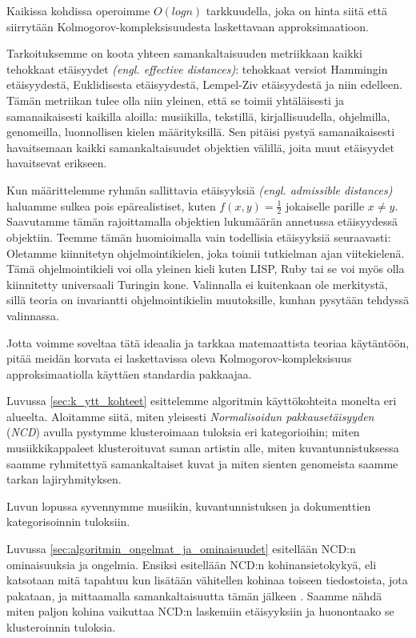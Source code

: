 \documentclass[12pt,finnish]{tktltiki2}
\theoremstyle{definition}
\theoremstyle{remark}
\newcommand{\engl}[1]{\emph{(engl. #1)}}
\begin{document}
  Kaikissa kohdissa  operoimme $O(log n)$ tarkkuudella, joka on hinta siitä että siirrytään Kolmogorov-kompleksisuudesta laskettavaan approksimaatioon.

  Tarkoituksemme on koota yhteen samankaltaisuuden metriikkaan kaikki tehokkaat etäisyydet \engl{effective distances}: tehokkaat versiot Hammingin etäisyydestä, Euklidisesta etäisyydestä, Lempel-Ziv etäisyydestä ja niin edelleen.
  Tämän metriikan tulee olla niin yleinen, että se toimii yhtäläisesti ja samanaikaisesti kaikilla aloilla: musiikilla, tekstillä, kirjallisuudella, ohjelmilla, genomeilla, luonnollisen kielen määrityksillä.
  Sen pitäisi pystyä samanaikaisesti havaitsemaan kaikki samankaltaisuudet objektien välillä, joita muut etäisyydet havaitsevat erikseen.

  Kun määrittelemme ryhmän sallittavia etäisyyksiä \engl{admissible distances} haluamme sulkea pois epärealistiset, kuten $f(x,y) = \frac{1}{2}$ jokaiselle parille $x \neq y$.
  Saavutamme tämän rajoittamalla objektien lukumäärän annetussa etäisyydessä objektiin.
  Teemme tämän huomioimalla vain todellisia etäisyyksiä seuraavasti: Oletamme kiinnitetyn ohjelmointikielen, joka toimii tutkielman ajan viitekielenä.
  Tämä ohjelmointikieli voi olla yleinen kieli kuten LISP, Ruby tai se voi myös olla kiinnitetty universaali Turingin kone. \cite{CV05,cilibrasi2007google}
  Valinnalla ei kuitenkaan ole merkitystä, sillä teoria on invariantti ohjelmointikielin muutoksille, kunhan pysytään tehdyssä valinnassa.


Jotta voimme soveltaa tätä ideaalia ja tarkkaa matemaattista teoriaa käytäntöön, pitää meidän korvata ei laskettavissa oleva Kolmogorov-kompleksisuus approksimaatiolla käyttäen standardia pakkaajaa.

\label{par:intro-3}
  Luvussa \ref{sec:k_ytt_kohteet} esittelemme algoritmin käyttökohteita monelta eri alueelta.
  Aloitamme siitä, miten yleisesti \emph{Normalisoidun pakkausetäisyyden} (\emph{NCD}) avulla pystymme klusteroimaan tuloksia eri kategorioihin; miten musiikkikappaleet klusteroituvat saman artistin alle, miten kuvantunnistuksessa saamme ryhmitettyä samankaltaiset kuvat ja miten sienten genomeista saamme tarkan lajiryhmityksen.


  Luvun lopussa syvennymme musiikin, kuvantunnistuksen ja dokumenttien kategorisoinnin tuloksiin.


\label{par:intro-4}
  Luvussa \ref{sec:algoritmin_ongelmat_ja_ominaisuudet} esitellään NCD:n ominaisuuksia ja ongelmia.
  Ensiksi esitellään NCD:n kohinansietokykyä, eli katsotaan mitä tapahtuu kun lisätään vähitellen kohinaa toiseen tiedostoista, jota pakataan, ja mittaamalla samankaltaisuutta tämän jälkeen \cite{4167725}.
  Saamme nähdä miten paljon kohina vaikuttaa NCD:n laskemiin etäisyyksiin ja huonontaako se klusteroinnin tuloksia.
\end{document}
